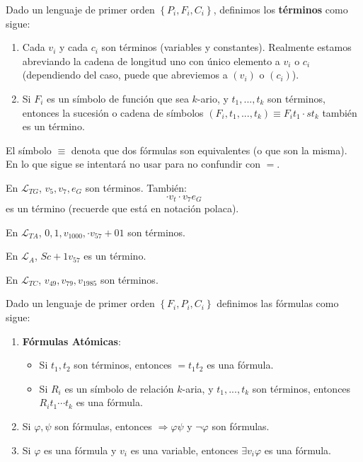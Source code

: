 \documentclass[12pt]{report}
\theoremstyle{largebreak}
\begin{document}
    \begin{mydef}
        Dado un lenguaje de primer orden $\left\{P_i,F_i,C_i \right\}$, definimos los \textbf{términos} como sigue:
        \begin{enumerate}
            \item Cada $v_i$ y cada $c_i$ son términos (variables y constantes). Realmente estamos abreviando la cadena de longitud uno con único elemento a $v_i$ o $c_i$ (dependiendo del caso, puede que abreviemos a $(v_i)$ o $(c_i)$).
            \item Si $F_i$ es un símbolo de función que sea $k$-ario, y $t_1,...,t_k$ son términos, entonces la sucesión o cadena de símbolos $(F_i,t_1,...,t_k)\equiv F_it_1\cdot st_k$ también es un término.
        \end{enumerate}
    \end{mydef}

    \begin{obs}
        El símbolo $\equiv$ denota que dos fórmulas son equivalentes (o que son la misma). En lo que sigue se intentará no usar para no confundir con $=$.
    \end{obs}

    \begin{exa}
        En $\mathcal{L}_{TG}$, $v_5,v_7,e_G$ son términos. También:
        \begin{equation*}
            \cdot v_t\cdot v_7 e_G
        \end{equation*}
        es un término (recuerde que está en notación polaca).

        En $\mathcal{L}_{ TA}$, $0,1,v_{1000},\cdot v_{57}+01$ son términos.

        En $\mathcal{L}_A$, $Sc+1v_{ 57}$ es un término.

        En $\mathcal{L}_{ TC}$, $v_{49},v_{79},v_{ 1985}$ son términos.
    \end{exa}

    \begin{mydef}
        Dado un lenguaje de primer orden $\left\{F_i,P_i,C_i \right\}$ definimos las fórmulas como sigue:
        \begin{enumerate}
            \item \textbf{Fórmulas Atómicas}:
            \begin{itemize}
                \item Si $t_1,t_2$ son términos, entonces $=t_1t_2$ es una fórmula.
                \item Si $R_i$ es un símbolo de relación $k$-aria, y $t_1,...,t_k$ son términos, entonces $R_it_1\cdots t_k$ es una fórmula.
            \end{itemize}
            \item Si $\varphi,\psi$ son fórmulas, entonces $\Rightarrow\varphi\psi$ y $\neg\varphi$ son fórmulas.
            \item Si $\varphi$ es una fórmula y $v_i$ es una variable, entonces $\exists v_i\varphi$ es una fórmula.
        \end{enumerate}
    \end{mydef}
\end{document}
